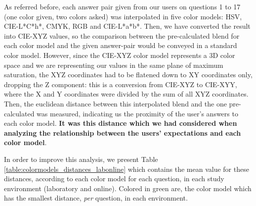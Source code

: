 %
As referred before, each answer pair given from our users on questions 1 to 17 (one color given, two colors asked) was interpolated in five color models:
HSV, CIE-L*C*h*, CMYK, RGB and CIE-L*a*b*. Then, we have converted the result into CIE-XYZ values, so the comparison between the pre-calculated blend for
each color model and the given answer-pair would be conveyed in a standard color model. However, since the CIE-XYZ color model represents a 3D color space
and we are representing our values in the same plane of maximum saturation, the XYZ coordinates had to be flatened down to XY coordinates only, dropping
the Z component: this is a conversion from CIE-XYZ to CIE-XYY, where the X and Y coordinates were divided by the sum of all XYZ coordinates. Then, the
euclidean distance between this interpolated blend and the one pre-calculated was measured, indicating us the proximity of the user's answers to each
color model. \textbf{It was this distance which we had considered when analyzing the relationship between the users' expectations and each color model}. \par
%
In order to improve this analysis, we present Table \ref{table:colormodels_distances_labonline} which contains the mean value for these distances,
according to each color model for each question, in each study environment (laboratory and online). Colored in green are, the color model which has the
smallest distance, \emph{per} question, in each environment. \par
%
%
